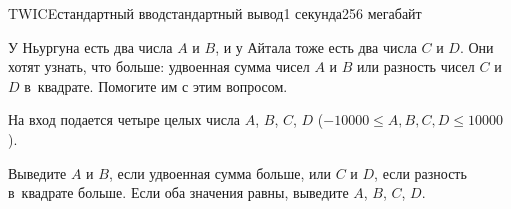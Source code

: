 \begin{problem}{TWICE}{стандартный ввод}{стандартный вывод}{1 секунда}{256 мегабайт}

У Ньургуна есть два числа $A$ и $B$, и у Айтала тоже есть два числа $C$ и $D$. Они хотят узнать, что больше: удвоенная сумма чисел $A$ и $B$ или разность чисел $C$ и $D$ в~квадрате. Помогите им с этим вопросом.

\InputFile
На вход подается четыре целых числа $A$, $B$, $C$, $D$ ($-10000 \leqslant A, B, C, D \leqslant 10000$).

\OutputFile
Выведите $A$ и $B$, если удвоенная сумма больше, или $C$ и $D$, если разность в~квадрате больше. Если оба значения равны, выведите $A$, $B$, $C$, $D$.

\Examples

\begin{example}
%
%
%
\end{example}

\end{problem}

